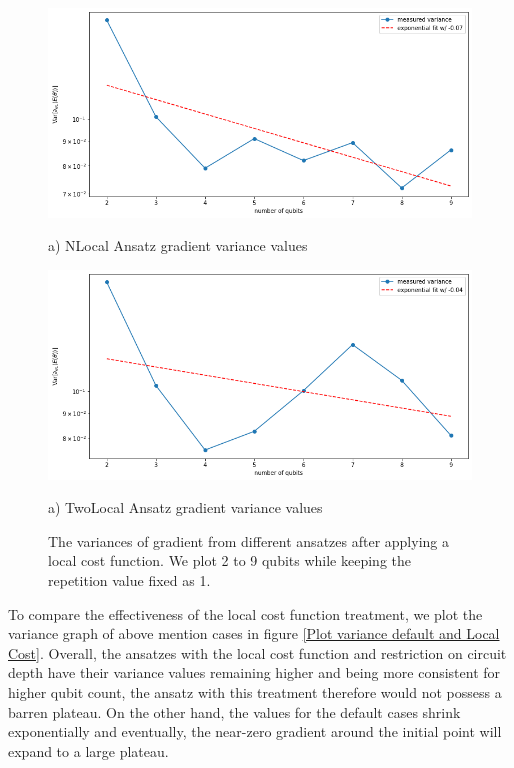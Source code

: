 \begin{figure}
    \includegraphics[width=\textwidth]{Artefact/Appendices/NLocalFixedLocal.png}
    \centerline{a) NLocal Ansatz gradient variance values}
    \includegraphics[width=\textwidth]{Artefact/Appendices/TwoLocalFixedLocal.png}
    \centerline{a) TwoLocal Ansatz gradient variance values}
    \caption{
        The variances of gradient from different ansatzes after applying a local cost function.
        We plot 2 to 9 qubits while keeping the repetition value fixed as 1. 
    }
    \label{Plot ansatzes variance local cost}
\end{figure}

To compare the effectiveness of the local cost function treatment, we plot the variance graph of above mention cases in figure \ref{Plot variance default and Local Cost}.
Overall, the ansatzes with the local cost function and restriction on circuit depth have their variance values remaining higher and being more consistent for higher qubit count, the ansatz with this treatment therefore would not possess a barren plateau.
On the other hand, the values for the default cases shrink exponentially and eventually, the near-zero gradient around the initial point will expand to a large plateau. 



